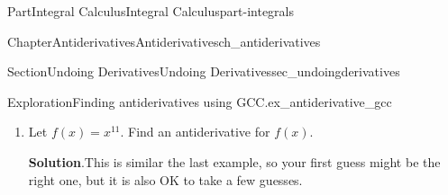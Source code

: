 \documentclass{tufte-book}
\newcommand{\blocktitlefont}{\relax}
\numberwithin{equation}{chapter}
\newcommand{\red}[1]{   {\color{red}   #1}   }
\newcommand{\ddx}[1]{ \dfrac{d}{dx} \Big[ #1 \Big]  }
\newcommand{\amp}{&}
\begin{document}
\begin{partptx}{Part}{Integral Calculus}{}{Integral Calculus}{}{}{part-integrals}
\begin{chapterptx}{Chapter}{Antiderivatives}{}{Antiderivatives}{}{}{ch_antiderivatives}
\begin{sectionptx}{Section}{Undoing Derivatives}{}{Undoing Derivatives}{}{}{sec_undoingderivatives}
\begin{exploration}{Exploration}{Finding antiderivatives using GCC.}{ex_antiderivative_gcc}
\begin{enumerate}[font=\bfseries,label=(\alph*),ref=\alph*]
\begin{descriptionlist}
\begin{dlimedium}{Guess 1}{ex_antiderivative_gcc-2-2-1-2-1}%
\emph{Guess:} The derivative of any power function is a power function.  So our first guess might as well be something like%
\begin{equation*}
F=x^5\text{.}
\end{equation*}
%
\par
\emph{Check:}%
\begin{equation*}
F'(x) = \ddx{x^5} = 5x^4 \red{\ \neq\  x^5}
\end{equation*}
Taking the derivative reduces the power by one, so if we want to end up with \(x^5\), we must start out with a \(x^6\) term.%
\end{dlimedium}%
\begin{dlimedium}{Guess 2:}{ex_antiderivative_gcc-2-2-1-2-2}%
\emph{Guess:} Now let's try guessing \(F(x)=x^6\)%
\par
\emph{Check:}%
\begin{equation*}
F'(x) = \ddx{x^6} = 6x^5 \red{\ \neq\  x^5}
\end{equation*}
We now have the correct power, but the wrong coefficient. To fix our guess, we should start out with a coefficient that will \emph{cancel out} the coefficient of \(6\).%
\end{dlimedium}%
\begin{dlimedium}{Guess 3:}{ex_antiderivative_gcc-2-2-1-2-3}%
\emph{Guess:} \(F(x) = \frac{1}{6}x^6\)%
\par
\emph{Check:}%
\begin{align*}
F'(x) \amp =\ddx{ \frac{1}{6}x^6 } \\
\amp =\frac{1}{6} \ddx{x^6}\\
\amp = \frac{1}{6} 6 x^5\\
\amp = x^5 
\end{align*}
That is the function we wanted \emph{after} the derivative.  Therefore \(F(x) = \frac{1}{6}x^6\) is the \emph{ante} derivative.%
\end{dlimedium}%
\end{descriptionlist}
%
\par
Therefore \(\frac{1}{6}x^{6}\) is an antiderivative of \(x^{5}\)%
\item{}Let \(f(x) = x^{11}\).  Find an antiderivative for \(f(x)\).%
\par\smallskip%
\noindent\textbf{\blocktitlefont Solution}.\hypertarget{ex_antiderivative_gcc-3-2}{}\quad{}This is similar the last example, so your first guess might be the right one, but it is also OK to take a few guesses.%

\end{enumerate}
\end{exploration}
\end{sectionptx}
\end{chapterptx}
\end{partptx}
\end{document}
